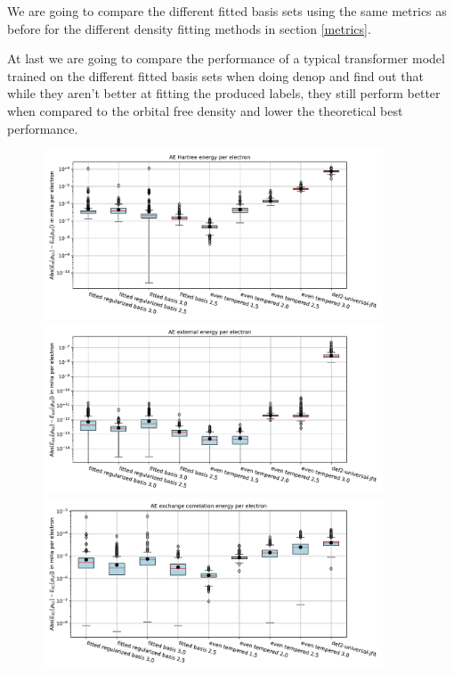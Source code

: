 We are going to compare the different fitted basis sets using the same metrics as before for the different density fitting methods in section \ref{metrics}.


 At last we are going to compare the performance of a typical transformer model trained on the different fitted basis sets when doing denop and find out that while they aren't better at fitting the produced labels, they still perform better when compared to the orbital free density and lower the theoretical best performance.

\begin{figure}
    \centering
    \includegraphics[width=0.9\textwidth]{chapters/results/results_images/AE_hartree_energy_on_hartree+external_MOFDFT_for_different_basis_sets}
    \includegraphics[width=0.9\textwidth]{chapters/results/results_images/AE_ext_energy_on_hartree+external_MOFDFT_for_different_basis_sets}
    \includegraphics[width=0.9\textwidth]{chapters/results/results_images/AE_xc_energy_on_hartree+external_MOFDFT_for_different_basis_sets}

\end{figure}
